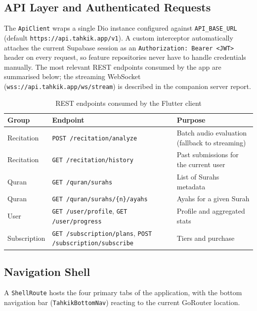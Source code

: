 \subsection{API Layer and Authenticated Requests}

The \texttt{ApiClient} wraps a single Dio instance configured against \texttt{API\_BASE\_URL} (default \texttt{https://api.tahkik.app/v1}). A custom interceptor automatically attaches the current Supabase session as an \texttt{Authorization: Bearer <JWT>} header on every request, so feature repositories never have to handle credentials manually. The most relevant REST endpoints consumed by the app are summarised below; the streaming WebSocket (\texttt{wss://api.tahkik.app/ws/stream}) is described in the companion server report.

\begin{table}[H]
  \centering
  \caption{REST endpoints consumed by the Flutter client}
  \label{tab:impl_app_endpoints}
  \renewcommand{\arraystretch}{1.3}
  \small
  \begin{tabularx}{\linewidth}{l >{\raggedright\arraybackslash}p{5.6cm} X}
    \toprule
    \textbf{Group} & \textbf{Endpoint} & \textbf{Purpose} \\
    \midrule
    Recitation & \texttt{POST /recitation/analyze} & Batch audio evaluation (fallback to streaming) \\
    Recitation & \texttt{GET /recitation/history}  & Past submissions for the current user \\
    Quran      & \texttt{GET /quran/surahs}        & List of Surahs metadata \\
    Quran      & \texttt{GET /quran/surahs/\{n\}/ayahs} & Ayahs for a given Surah \\
    User       & \texttt{GET /user/profile}, \newline \texttt{GET /user/progress} & Profile and aggregated stats \\
    Subscription & \texttt{GET /subscription/plans}, \newline \texttt{POST /subscription/subscribe} & Tiers and purchase \\
    \bottomrule
  \end{tabularx}
\end{table}

\subsection{Navigation Shell}

A \texttt{ShellRoute} hosts the four primary tabs of the application, with the bottom navigation bar (\texttt{TahkikBottomNav}) reacting to the current GoRouter location.


